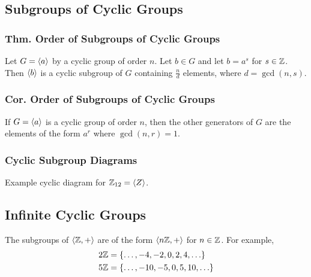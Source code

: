 \subsection{Subgroups of Cyclic Groups}

\subsubsection{Thm. Order of Subgroups of Cyclic Groups}
Let $G = \langle a \rangle$ by a cyclic group of order $n$. Let $b \in G$ and let $b = a^s$ for $s \in \mathbb{Z}$. Then $\langle b \rangle$ is a cyclic subgroup of $G$ containing $\frac{n}{d}$ elements, where $d = \gcd(n,s)$.

\subsubsection{Cor. Order of Subgroups of Cyclic Groups}
If $G = \langle a \rangle$ is a cyclic group of order $n$, then the other generators of $G$ are the elements of the form $a^r$ where $\gcd(n,r) = 1$.

\subsubsection*{Cyclic Subgroup Diagrams}
Example cyclic diagram for $\mathbb{Z}_{12} = \langle Z \rangle$.
\begin{center}
\end{center}

\subsection{Infinite Cyclic Groups}
The subgroups of $\langle \mathbb{Z},+ \rangle$ are of the form $\langle n\mathbb{Z}, + \rangle$ for $n \in \mathbb{Z}$. For example,
\begin{align*}
    2\mathbb{Z} & = \{\ldots, -4,-2,0,2,4,\ldots\} \\
    5\mathbb{Z} & = \{\ldots, -10,-5,0,5,10,\ldots\}
\end{align*}